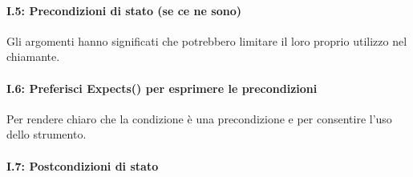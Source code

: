 \paragraph{I.5: Precondizioni di stato (se ce ne sono)}

\textsf{\small Gli argomenti hanno significati che potrebbero limitare il loro proprio utilizzo nel chiamante.} \\

\paragraph{I.6: Preferisci \textbf{Expects()} per esprimere le precondizioni}

\textsf{\small Per rendere chiaro che la condizione è una precondizione e per consentire l'uso dello strumento.} \\ %

\paragraph{I.7: Postcondizioni di stato }

